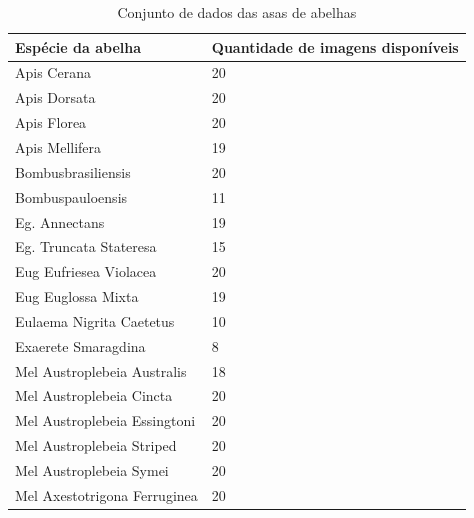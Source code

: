 \documentclass[
	12pt,				%
	oneside,			%
	a4paper,			%
	english,			%
	brazil				%
	]{abntex2ppgsi}
\begin{document}
\begin{longtable}[c]{|l|l|}
\caption{Conjunto de dados das asas de abelhas}
\label{tab:conjunto_dados_abelhas}\\
\hline
\textbf{Espécie da abelha}      & \textbf{Quantidade de imagens disponíveis} \\ \hline
\endfirsthead
%
\endhead
%
Apis Cerana                     & 20                                         \\ \hline
Apis Dorsata                    & 20                                         \\ \hline
Apis Florea                     & 20                                         \\ \hline
Apis Mellifera                  & 19                                         \\ \hline
Bombusbrasiliensis              & 20                                         \\ \hline
Bombuspauloensis                & 11                                         \\ \hline
Eg. Annectans                   & 19                                         \\ \hline
Eg. Truncata Stateresa           & 15                                         \\ \hline
Eug Eufriesea Violacea          & 20                                         \\ \hline
Eug Euglossa Mixta              & 19                                         \\ \hline
Eulaema Nigrita Caetetus        & 10                                         \\ \hline
Exaerete Smaragdina             & 8                                          \\ \hline
Mel Austroplebeia Australis     & 18                                         \\ \hline
Mel Austroplebeia Cincta        & 20                                         \\ \hline
Mel Austroplebeia Essingtoni    & 20                                         \\ \hline
Mel Austroplebeia Striped       & 20                                         \\ \hline
Mel Austroplebeia Symei         & 20                                         \\ \hline
Mel Axestotrigona Ferruginea    & 20                                         \\ \hline

\end{longtable}
\end{document}
